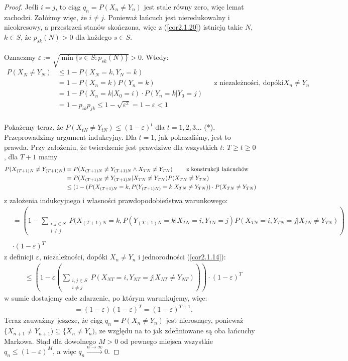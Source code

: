 \documentclass[a4paper]{article}
\theoremstyle{defn}
\theoremstyle{theorem}
\theoremstyle{lemma}
\theoremstyle{cor}
\theoremstyle{fact}
\begin{document}
\begin{proof}
Jeśli $i = j$, to ciąg $q_n = P(X_n \neq Y_n)$ jest stale równy zero, więc lemat zachodzi. Załóżmy więc, że $i \neq j$. Ponieważ łańcuch jest nieredukowalny i nieokresowy, a przestrzeń stanów skończona, więc z (\ref{cor2.1.20}) istnieją takie $N$, $k \in S$, że $p_{sk}(N) > 0$ dla każdego $s \in S$.\\\\
Oznaczmy $\varepsilon := \sqrt{\min\{s \in S: p_{sk}(N)\}} > 0$. Wtedy:
\begin{align*}
P(X_N \neq Y_N) &\leq 1 - P(X_N = k, Y_N = k) \\
&= 1 - P(X_n = k)P(Y_n = k) && \text{z niezależności, dopóki $X_n \neq Y_n$} \\
&= 1 - P(X_n = k|X_0 = i) \cdot P(Y_n = k|Y_0 = j) \\
&= 1 - p_{ik}p_{jk} \leq 1 - \sqrt{\varepsilon^2} = 1 - \varepsilon < 1
\end{align*}
\\
Pokażemy teraz, że $P(X_{tN} \neq Y_{tN}) \leq (1-\varepsilon)^t$ dla $t=1,2,3...$ (*). Przeprowadzimy argument indukcyjny. Dla $t = 1$, jak pokazaliśmy, jest to prawda. Przy założeniu, że twierdzenie jest prawdziwe dla wszystkich $t$: $T \geq t \geq 0$, dla $T+1$ mamy
\begin{align*}
    P(X_{(T+1)N} \neq Y_{(T+1)N}) &= P(X_{(T+1)N} \neq Y_{(T+1)N} \land X_{TN} \neq Y_{TN})
    \text{ \quad\quad z konstrukcji łańcuchów}\\
    &= P(X_{(T+1)N} \neq Y_{(T+1)N} | X_{TN} \neq Y_{TN})P(X_{TN} \neq Y_{TN})\\
    &\leq (1 - (P(X_{(T+1)N} = k, P(Y_{(T+1)N)} = k  |  X_{TN} \neq Y_{TN})) \cdot P(X_{TN} \neq Y_{TN})
    \end{align*}
    z założenia indukcyjnego i własności prawdopodobieństwa warunkowego:
    \begin{align*}
    & = \left(1 - \sum\limits_{\substack{i,j \in S\\i\neq j}} P(X_{(T+1)N} = k, P(Y_{(T+1)N} = k | X_{TN} = i, Y_{TN} = j)P(X_{TN} = i, Y_{TN} = j | X_{TN} \neq Y_{TN})\right)\\\\
    &\cdot (1 - \varepsilon)^T
\end{align*}
 z definicji $\varepsilon$, niezależności, dopóki $X_n \neq Y_n$ i jednorodności (\ref{cor2.1.14}):
\begin{align*}
    &\leq \left( 1 - \varepsilon \left(\sum_{\substack{i,j \in S\\i\neq j}} P(X_{NT} = i, Y_{NT} = j | X_{NT} \neq Y_{NT})\right)\right)\cdot (1- \varepsilon)^T
\end{align*}
w sumie dostajemy całe zdarzenie, po którym warunkujemy, więc:
\begin{align*}
    &= (1-\varepsilon)(1-\varepsilon)^T = (1- \varepsilon)^{T+1}.
\end{align*}
Teraz zauważmy jeszcze, że ciąg $q_n = P(X_n \neq Y_n)$ jest nierosnący, ponieważ $\{X_{n+1} \neq Y_{n+1}) \subseteq \{X_{n} \neq Y_{n})$, ze względu na to jak zdefiniowane są oba łańcuchy Markowa. Stąd dla dowolnego $M > 0$ od pewnego miejsca wszystkie $q_n \leq (1-\varepsilon)^M$, a więc $q_n \xrightarrow{n \to \infty} 0$.
\end{proof}
\end{document}
